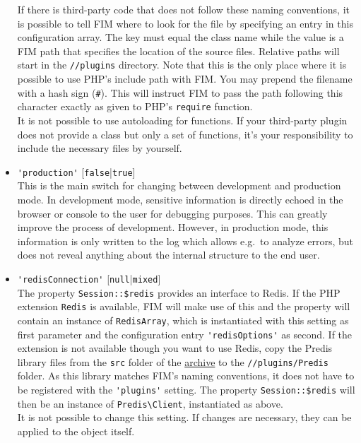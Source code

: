 \documentclass{scrartcl}
\begin{document}
\begin{itemize}
               If there is third-party code that does not follow these naming conventions, it is possible to tell FIM where to look for the file by specifying an entry in this configuration array. The key must equal the class name while the value is a FIM path that specifies the location of the source files. Relative paths will start in the \texttt{//plugins} directory. Note that this is the only place where it is possible to use PHP's include path with FIM. You may prepend the filename with a hash sign (\texttt{\#}). This will instruct FIM to pass the path following this character exactly as given to PHP's \lstinline!require! function. \\
               It is not possible to use autoloading for functions. If your third-party plugin does not provide a class but only a set of functions, it's your responsibility to include the necessary files by yourself.
            \item \lstinline!'production'! [\lstinline!false!|\lstinline!true!] \\
               This is the main switch for changing between development and production mode. In development mode, sensitive information is directly echoed in the browser or console to the user for debugging purposes. This can greatly improve the process of development. However, in production mode, this information is only written to the log which allows e.g.\ to analyze errors, but does not reveal anything about the internal structure to the end user.
            \item \lstinline!'redisConnection'! [\lstinline!null!|\lstinline!mixed!] \\
               The property \lstinline!Session::$redis! provides an interface to Redis. If the PHP extension \texttt{Redis} is available, FIM will make use of this and the property will contain an instance of \lstinline!RedisArray!, which is instantiated with this setting as first parameter and the configuration entry \lstinline!'redisOptions'! as second. If the extension is not available though you want to use Redis, copy the Predis library files from the \texttt{src} folder of the \href{https://github.com/nrk/predis}{\color{blue}archive} to the \texttt{//plugins/Predis} folder. As this library matches FIM's naming conventions, it does not have to be registered with the \lstinline!'plugins'! setting. The property \lstinline!Session::$redis! will then be an instance of \lstinline!Predis\Client!, instantiated as above. \\
               It is not possible to change this setting. If changes are necessary, they can be applied to the object itself.

\end{itemize}
\end{document}
